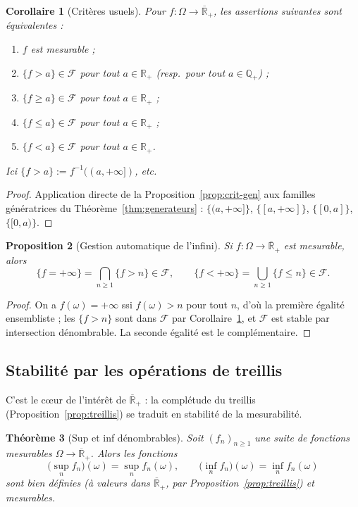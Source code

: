 \documentclass[11pt,a4paper]{article}
\theoremstyle{plain}
\newtheorem{theorem}{Théorème}[section]
\newtheorem{proposition}[theorem]{Proposition}
\newtheorem{corollary}[theorem]{Corollaire}
\theoremstyle{definition}
\newcommand{\Q}{\mathbb{Q}}
\newcommand{\Rp}{\mathbb{R}_+}
\newcommand{\Rpb}{\overline{\mathbb{R}}_+}
\newcommand{\F}{\mathcal{F}}
\begin{document}
\begin{corollary}[Critères usuels]\label{cor:criteres}
Pour $f:\Omega\to\Rpb$, les assertions suivantes sont équivalentes :
\begin{enumerate}[label=(\roman*),nosep]
\item $f$ est mesurable ;
\item $\{f>a\}\in\F$ pour tout $a\in\Rp$ (resp.\ pour tout $a\in\Q_+$) ;
\item $\{f\ge a\}\in\F$ pour tout $a\in\Rp$ ;
\item $\{f\le a\}\in\F$ pour tout $a\in\Rp$ ;
\item $\{f<a\}\in\F$ pour tout $a\in\Rp$.
\end{enumerate}
Ici $\{f>a\}:=f^{-1}((a,+\infty])$, etc.
\end{corollary}

\begin{proof}
Application directe de la Proposition~\ref{prop:crit-gen} aux familles
génératrices du Théorème~\ref{thm:generateurs} :
$\{(a,+\infty]\}$, $\{[a,+\infty]\}$, $\{[0,a]\}$, $\{[0,a)\}$.
\end{proof}

\begin{proposition}[Gestion automatique de l'infini]\label{prop:infini-auto}
Si $f:\Omega\to\Rpb$ est mesurable, alors
\[
\{f=+\infty\}=\bigcap_{n\ge1}\{f>n\}\in\F,\qquad
\{f<+\infty\}=\bigcup_{n\ge1}\{f\le n\}\in\F.
\]
\end{proposition}

\begin{proof}
On a $f(\omega)=+\infty$ ssi $f(\omega)>n$ pour tout $n$, d'où la première
égalité ensembliste ; les $\{f>n\}$ sont dans $\F$ par
Corollaire~\ref{cor:criteres}, et $\F$ est stable par intersection
dénombrable. La seconde égalité est le complémentaire.
\end{proof}

\subsection{Stabilité par les opérations de treillis}

C'est le c\oe ur de l'intérêt de $\Rpb$ : la complétude du treillis
(Proposition~\ref{prop:treillis}) se traduit en stabilité de la mesurabilité.

\begin{theorem}[Sup et inf dénombrables]\label{thm:supinf}
Soit $(f_n)_{n\ge1}$ une suite de fonctions mesurables $\Omega\to\Rpb$. Alors
les fonctions
\[
\Big(\sup_n f_n\Big)(\omega)=\sup_n f_n(\omega),\qquad
\Big(\inf_n f_n\Big)(\omega)=\inf_n f_n(\omega)
\]
sont bien définies (à valeurs dans $\Rpb$, par
Proposition~\ref{prop:treillis}) et mesurables.
\end{theorem}
\end{document}
